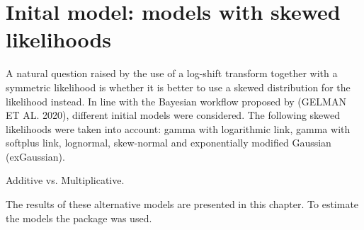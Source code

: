 \section{Inital model: models with skewed likelihoods}

A natural question raised by the use of a log-shift transform together with a symmetric likelihood is whether it is better to use a skewed distribution for the likelihood instead.
In line with the Bayesian workflow proposed by (GELMAN ET AL. 2020), different initial models were considered.
The following skewed likelihoods were taken into account: gamma with logarithmic link, gamma with
softplus link, lognormal, skew-normal and exponentially modified Gaussian (exGaussian).

Additive vs. Multiplicative.

The results of these alternative models are presented in this chapter.
To estimate the models the package  was used.

